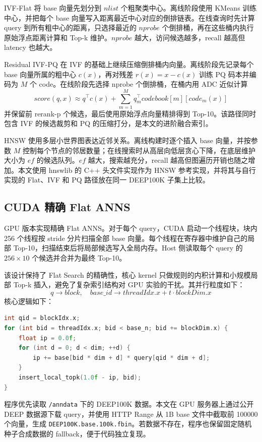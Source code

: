 \documentclass[UTF8,a4paper,10pt]{ctexart}
\begin{document}
IVF-Flat 将 base 向量先划分到 $nlist$ 个粗聚类中心。离线阶段使用 KMeans 训练中心，并把每个 base 向量写入距离最近中心对应的倒排链表。在线查询时先计算 query 到所有粗中心的距离，只选择最近的 $nprobe$ 个倒排桶，再在这些桶内执行原始浮点距离计算和 Top-k 维护。$nprobe$ 越大，访问候选越多，recall 越高但 latency 也越大。

Residual IVF-PQ 在 IVF 的基础上继续压缩倒排桶内向量。离线阶段先记录每个 base 向量所属的粗中心 $c(x)$，再对残差 $r(x)=x-c(x)$ 训练 PQ 码本并编码为 $M$ 个 code。在线阶段先选择 nprobe 个倒排桶，在桶内用 ADC 近似计算
\[
score(q,x)\approx q^\top c(x)+\sum_{m=1}^{M} q_m^\top codebook[m][code_m(x)]
\]
并保留前 rerank-p 个候选，最后使用原始浮点向量精排得到 Top-10。该路径同时包含 IVF 的候选裁剪和 PQ 的压缩打分，是本文的进阶融合索引。

HNSW 使用多层小世界图表达近邻关系。离线构建时逐个插入 base 向量，并按参数 $M$ 控制每个节点的邻居数量；在线搜索时从高层向低层贪心下降，在底层维护大小为 $ef$ 的候选队列。$ef$ 越大，搜索越充分，recall 越高但图遍历开销也随之增加。本文使用 hnswlib 的 C++ 头文件实现作为 HNSW 参考实现，并将其与自行实现的 Flat、IVF 和 PQ 路径放在同一 DEEP100K 子集上比较。

\subsection{CUDA 精确 Flat ANNS}

GPU 版本实现精确 Flat ANNS。对于每个 query，CUDA 启动一个线程块，块内 256 个线程按 stride 分片扫描全部 base 向量。每个线程在寄存器中维护自己的局部 Top-10，扫描结束后将局部候选写入全局内存。Host 侧读取每个 query 的 $256\times 10$ 个候选并合并为最终 Top-10。

该设计保持了 Flat Search 的精确性，核心 kernel 只做规则的内积计算和小规模局部 Top-k 插入，避免了复杂索引结构对 GPU 实验的干扰。其并行粒度如下：
\[
q \rightarrow block,\quad base\_id \rightarrow threadIdx.x + t\cdot blockDim.x
\]
核心逻辑如下：

\begin{lstlisting}[language=C++]
int qid = blockIdx.x;
for (int bid = threadIdx.x; bid < base_n; bid += blockDim.x) {
    float ip = 0.0f;
    for (int d = 0; d < dim; ++d) {
        ip += base[bid * dim + d] * query[qid * dim + d];
    }
    insert_local_topk(1.0f - ip, bid);
}
\end{lstlisting}

程序优先读取 \texttt{/anndata} 下的 DEEP100K 数据。本文在 GPU 服务器上通过公开 DEEP 数据源下载 query，并使用 HTTP Range 从 1B base 文件中截取前 100000 个向量，生成 \texttt{DEEP100K.base.100k.fbin}。若数据不存在，程序也保留固定随机种子合成数据的 fallback，便于代码独立复现。
\end{document}
